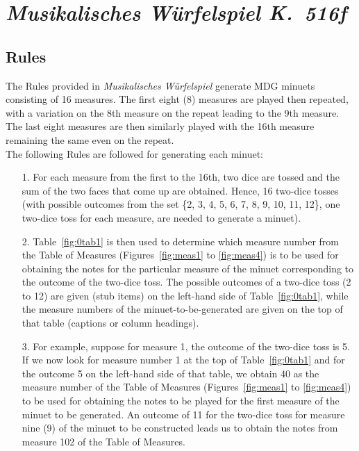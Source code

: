 \documentclass[letterpaper,x11names,svgnames,10pt]{article}
\begin{document}
\section{\em Musikalisches W\"{u}rfelspiel K.\ 516f}

\subsection{Rules}

The Rules provided in {\em Musikalisches W\"{u}rfelspiel} generate MDG minuets consisting of 16 measures.  The first eight (8) measures are played then repeated, with a variation on the 8th measure on the repeat leading to the 9th measure.  The last eight measures are then similarly played with the 16th measure remaining the same even on the repeat. \\

The following Rules are followed for generating each minuet:
\begin{enumerate}
	\item [1.] For each measure from the first to the 16th, two dice are tossed and the sum of the two faces that come up are obtained.  Hence, 16 two-dice tosses (with possible outcomes from the set \{2, 3, 4, 5, 6, 7, 8, 9, 10, 11, 12\}, one two-dice toss for each measure, are needed to generate a minuet).   
	\item [2.] Table~\ref{fig:0tab1} is then used to determine which measure number from the Table of Measures (Figures~\ref{fig:meas1} to \ref{fig:meas4}) is to be used for obtaining the notes for the particular measure of the minuet corresponding to the outcome of the two-dice toss.  The possible outcomes of a two-dice toss (2 to 12) are given (stub items) on the left-hand side of Table~\ref{fig:0tab1}, while the measure numbers of the minuet-to-be-generated are given on the top of that table (captions or column  headings).
	\item [3.]  For example, suppose for measure 1, the outcome of the two-dice toss is 5.  If we now look for measure number 1 at the top of Table~\ref{fig:0tab1} and for the outcome 5 on the left-hand side of that table, we obtain 40 as the measure number of the Table of Measures (Figures~\ref{fig:meas1} to \ref{fig:meas4}) to be used for obtaining the notes to be played for the first measure of the minuet to be generated.  An outcome of 11 for the two-dice toss for measure nine (9) of the minuet to be constructed leads us to obtain the notes from measure 102 of the Table of Measures.
\end{enumerate}   
\end{document}
